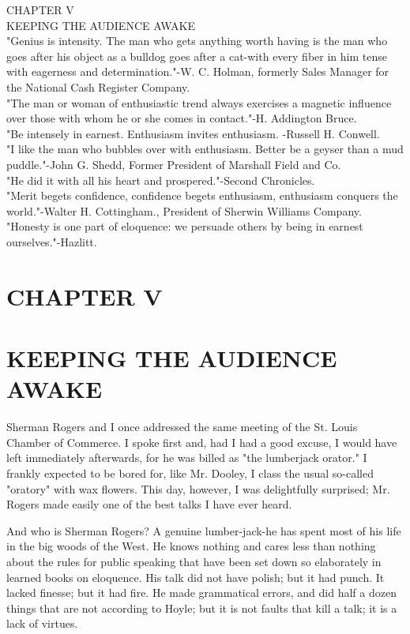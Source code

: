 \documentclass[10pt]{article}
\begin{document}
CHAPTER V\\
KEEPING THE AUDIENCE AWAKE\\
"Genius is intensity. The man who gets anything worth having is the man who goes after his object as a bulldog goes after a cat-with every fiber in him tense with eagerness and determination."-W. C. Holman, formerly Sales Manager for the National Cash Register Company.\\
"The man or woman of enthusiastic trend always exercises a magnetic influence over those with whom he or she comes in contact."-H. Addington Bruce.\\
"Be intensely in earnest. Enthusiasm invites enthusiasm. -Russell H. Conwell.\\
"I like the man who bubbles over with enthusiasm. Better be a geyser than a mud puddle."-John G. Shedd, Former President of Marshall Field and Co.\\
"He did it with all his heart and prospered."-Second Chronicles.\\
"Merit begets confidence, confidence begets enthusiasm, enthusiasm conquers the world."-Walter H. Cottingham., President of Sherwin Williams Company.\\
"Honesty is one part of eloquence: we persuade others by being in earnest ourselves."-Hazlitt.

\section*{CHAPTER V}
\section*{KEEPING THE AUDIENCE AWAKE}
Sherman Rogers and I once addressed the same meeting of the St. Louis Chamber of Commerce. I spoke first and, had I had a good excuse, I would have left immediately afterwards, for he was billed as "the lumberjack orator." I frankly expected to be bored for, like Mr. Dooley, I class the usual so-called "oratory" with wax flowers. This day, however, I was delightfully surprised; Mr. Rogers made easily one of the best talks I have ever heard.

And who is Sherman Rogers? A genuine lumber-jack-he has spent most of his life in the big woods of the West. He knows nothing and cares less than nothing about the rules for public speaking that have been set down so elaborately in learned books on eloquence. His talk did not have polish; but it had punch. It lacked finesse; but it had fire. He made grammatical errors, and did half a dozen things that are not according to Hoyle; but it is not faults that kill a talk; it is a lack of virtues.
\end{document}
